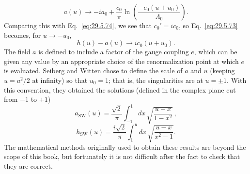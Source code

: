 \begin{equation}
  a(u)\longrightarrow-ia_0+\frac{c_0}{\pi}
  \ln\left(\frac{-c_0(u+u_0)}{\Lambda_0}\right).
  \tag{29.5.75}\label{eq:29.5.75}
\end{equation}
Comparing this with Eq.~\eqref{eq:29.5.74}, we see that
\(c_0'=ic_0\), so Eq.~\eqref{eq:29.5.73} becomes, for
\(u\longrightarrow-u_0\),
\begin{equation}
  h(u)-a(u)\longrightarrow ic_0(u+u_0).
  \tag{29.5.76}\label{eq:29.5.76}
\end{equation}
The field \(a\) is defined to include a factor of the gauge coupling \(e\),
which can be given any value by an appropriate choice of the renormalization
point at which \(e\) is evaluated. Seiberg and Witten chose to define the
scale of \(a\) and \(u\) (keeping \(u=a^2/2\) at infinity) so that \(u_0=1\);
that is, the singularities are at \(u=\pm1\). With this convention, they
obtained the solutions (defined in the complex plane cut from \(-1\) to
\(+1\))
\begin{equation}
  a_{\mathrm{SW}}(u)
  =\frac{\sqrt{2}}{\pi}\int_{-1}^{1}dx\,
    \sqrt{\frac{u-x}{1-x^2}}\,,
  \tag{29.5.77}\label{eq:29.5.77}
\end{equation}
\begin{equation}
  h_{\mathrm{SW}}(u)
  =\frac{i\sqrt{2}}{\pi}\int_1^u dx\,
    \sqrt{\frac{u-x}{x^2-1}}.
  \tag{29.5.78}\label{eq:29.5.78}
\end{equation}
The mathematical methods originally used to obtain these results are beyond
the scope of this book, but fortunately it is not difficult after the fact
to check that they are correct.

